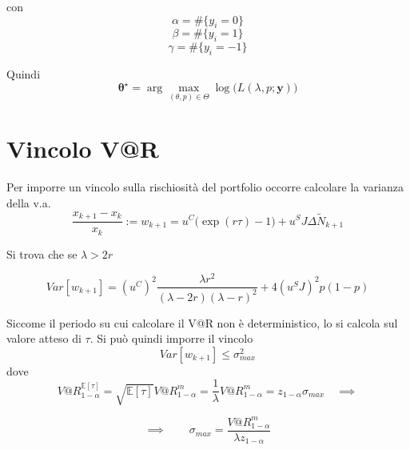 \documentclass[12pt]{article}
\theoremstyle{break}
\begin{document}
con 
\[ \alpha =  \#\{y_i = 0\}\]
\[ \beta =  \#\{y_i = 1\}\]
\[ \gamma =  \#\{y_i = -1\}\]

Quindi \[
\mathbf{\theta^{\star}} = \arg\max_{(\theta,p) \in \Theta} \log\Big( L(\lambda,p;\mathbf{y})\Big)
\]

\section{Vincolo V@R}
Per imporre un vincolo sulla rischiosità del portfolio occorre calcolare la varianza della v.a.
\begin{equation}
\frac{x_{k+1}-x_k}{x_k} := w_{k+1} = u^C\big(\exp(r \tau)-1\big) + u^S J\Delta \widetilde{N}_{k+1} 
\end{equation}

Si trova che se $ \lambda > 2 r$ 

\begin{equation}
Var[w_{k+1}] = (u^C)^2\frac{\lambda r^2}{(\lambda-2r)(\lambda-r)^2} + 4(u^S J)^2p(1-p)
\end{equation}

Siccome il periodo su cui calcolare il V@R non è deterministico, lo si calcola sul valore atteso di $\tau$. Si può quindi imporre il vincolo
\[
Var[w_{k+1}] \leq \sigma^2_{max}
\]
dove
\[
V@R^{\mathbb{E}[\tau]}_{1-\alpha} = \sqrt{\mathbb{E}[\tau]}V@R^m_{1-\alpha} = \frac{1}{\lambda}V@R^m_{1-\alpha} =  z_{1-\alpha}\sigma_{max} \quad \implies
\]

\[
\implies \qquad \boxed{\sigma_{max} = \frac{V@R^m_{1-\alpha}}{\lambda z_{1-\alpha}}}
\]
\end{document}
